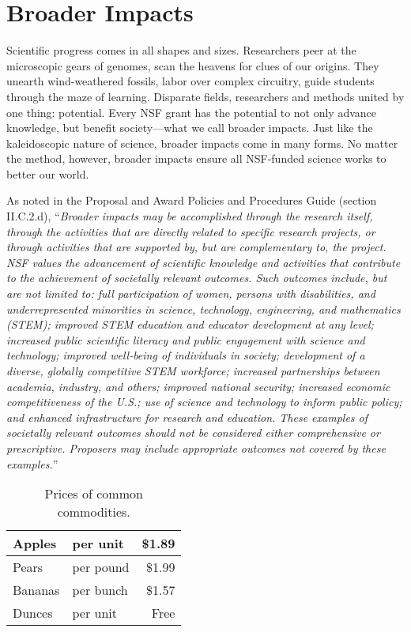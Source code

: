 \documentclass[11pt]{article}
\begin{document}
\section{Broader Impacts\label{sec:BI}}

Scientific progress comes in all shapes and sizes. Researchers peer at the microscopic gears of genomes, scan the heavens for clues of our origins. They unearth wind-weathered fossils, labor over complex circuitry, guide students through the maze of learning. Disparate fields, researchers and methods united by one thing: potential. Every NSF grant has the potential to not only advance knowledge, but benefit society---what we call broader impacts. Just like the kaleidoscopic nature of science, broader impacts come in many forms. No matter the method, however, broader impacts ensure all NSF-funded science works to better our world.

As noted in the Proposal and Award Policies and Procedures Guide (section II.C.2.d), ``\textit{Broader impacts may be accomplished through the research itself, through the activities that are directly related to specific research projects, or through activities that are supported by, but are complementary to, the project. NSF values the advancement of scientific knowledge and activities that contribute to the achievement of societally relevant outcomes. Such outcomes include, but are not limited to: full participation of women, persons with disabilities, and underrepresented minorities in science, technology, engineering, and mathematics (STEM); improved STEM education and educator development at any level; increased public scientific literacy and public engagement with science and technology; improved well-being of individuals in society; development of a diverse, globally competitive STEM workforce; increased partnerships between academia, industry, and others; improved national security; increased economic competitiveness of the U.S.; use of science and technology to inform public policy; and enhanced infrastructure for research and education. These examples of societally relevant outcomes should not be considered either comprehensive or prescriptive. Proposers may include appropriate outcomes not covered by these examples.}''

\begin{table}
 \begin{center}
  \begin{tabular}{|l|l|r|}
  \hline
   Apples & per unit & \$1.89 \\
  \hline
   Pears & per pound & \$1.99 \\
  \hline
   Bananas & per bunch & \$1.57 \\
  \hline
   Dunces & per unit & Free \\
   \hline
  \end{tabular}
 \end{center}
 \caption{Prices of common commodities.}
 \label{table-prices}
\end{table}
\end{document}
